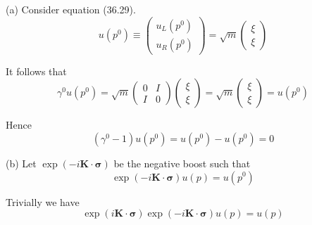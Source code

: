 


\bigskip
(a) Consider equation (36.29).
\begin{equation*}
u(p^0)\equiv\begin{pmatrix}u_L(p^0)\\u_R(p^0)\end{pmatrix}
=\sqrt m\begin{pmatrix}\xi\\\xi\end{pmatrix}
\tag{36.29}
\end{equation*}

It follows that
\begin{equation*}
\gamma^0u(p^0)=\sqrt m\begin{pmatrix}0&I\\I&0\end{pmatrix}\begin{pmatrix}\xi\\ \xi\end{pmatrix}
=\sqrt m\begin{pmatrix}\xi\\ \xi\end{pmatrix}=u(p^0)
\end{equation*}

Hence
\begin{equation*}
(\gamma^0-1)u(p^0)=u(p^0)-u(p^0)=0
\end{equation*}

(b) Let $\exp(-i\mathbf K\cdot\boldsymbol\sigma)$ be the negative boost such that
\begin{equation*}
\exp(-i\mathbf K\cdot\boldsymbol\sigma)u(p)=u(p^0)
\tag{1}
\end{equation*}

Trivially we have
\begin{equation*}
\exp(i\mathbf K\cdot\boldsymbol\sigma)\exp(-i\mathbf K\cdot\boldsymbol\sigma)u(p)=u(p)
\tag{2}
\end{equation*}

